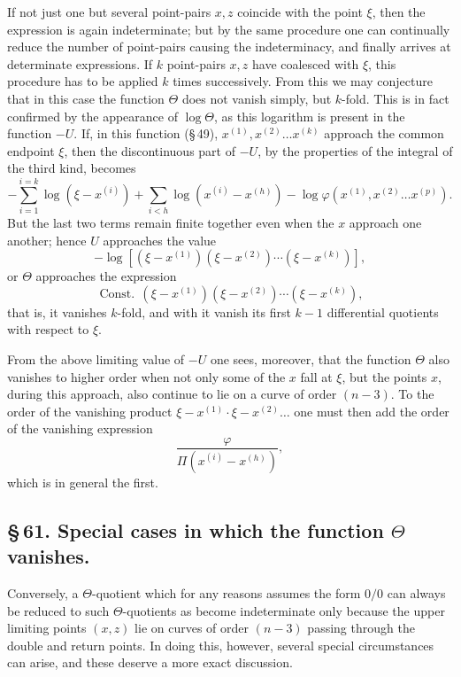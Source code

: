 \documentclass[10pt]{article}
\begin{document}
If not just one but several point-pairs \(x,z\) coincide with the point \(\xi\), then the expression is again indeterminate; but by the same procedure one can continually reduce the number of point-pairs causing the indeterminacy, and finally arrives at determinate expressions. If \(k\) point-pairs \(x,z\) have coalesced with \(\xi\), this procedure has to be applied \(k\) times successively. From this we may conjecture that in this case the function \(\Theta\) does not vanish simply, but \(k\)-fold. This is in fact confirmed by the appearance of \(\log\Theta\), as this logarithm is present in the function \(-U\). If, in this function (\S\,49), \(x^{(1)},x^{(2)}\ldots x^{(k)}\) approach the common endpoint \(\xi\), then the discontinuous part of \(-U\), by the properties of the integral of the third kind, becomes
\[
-\sum_{i=1}^{i=k}\log(\xi-x^{(i)})+
\sum_{i<h}\log(x^{(i)}-x^{(h)})-
\log\varphi(x^{(1)},x^{(2)}\ldots x^{(p)}).
\]
But the last two terms remain finite together even when the \(x\) approach one another; hence \(U\) approaches the value
\[
-\log\left[(\xi-x^{(1)})(\xi-x^{(2)})\cdots(\xi-x^{(k)})\right],
\]
or \(\Theta\) approaches the expression
\[
\operatorname{Const.}\,(\xi-x^{(1)})(\xi-x^{(2)})\cdots(\xi-x^{(k)}),
\]
that is, it vanishes \(k\)-fold, and with it vanish its first \(k-1\) differential quotients with respect to \(\xi\).

From the above limiting value of \(-U\) one sees, moreover, that the function \(\Theta\) also vanishes to higher order when not only some of the \(x\) fall at \(\xi\), but the points \(x\), during this approach, also continue to lie on a curve of order \((n-3)\). To the order of the vanishing product \(\xi-x^{(1)}\cdot\xi-x^{(2)}\ldots\) one must then add the order of the vanishing expression
\[
\frac{\varphi}{\Pi(x^{(i)}-x^{(h)})},
\]
which is in general the first.

\subsection*{\S\,61. Special cases in which the function \(\Theta\) vanishes.}

Conversely, a \(\Theta\)-quotient which for any reasons assumes the form \(0/0\) can always be reduced to such \(\Theta\)-quotients as become indeterminate only because the upper limiting points \((x,z)\) lie on curves of order \((n-3)\) passing through the double and return points. In doing this, however, several special circumstances can arise, and these deserve a more exact discussion.
\end{document}
